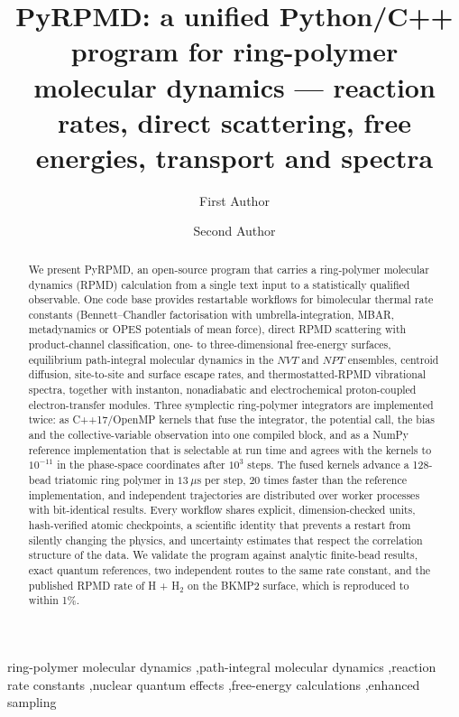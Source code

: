 \documentclass[preprint,12pt]{elsarticle}
\begin{document}
\begin{frontmatter}

\title{PyRPMD: a unified Python/C++ program for ring-polymer molecular dynamics --- reaction rates, direct scattering, free energies, transport and spectra}

\author[a]{First Author}
\author[a]{Second Author}

\address[a]{Affiliation, City, Country}

\begin{abstract}
We present PyRPMD, an open-source program that carries a ring-polymer molecular dynamics (RPMD) calculation from a single text input to a statistically qualified observable. One code base provides restartable workflows for bimolecular thermal rate constants (Bennett--Chandler factorisation with umbrella-integration, MBAR, metadynamics or OPES potentials of mean force), direct RPMD scattering with product-channel classification, one- to three-dimensional free-energy surfaces, equilibrium path-integral molecular dynamics in the $NVT$ and $NPT$ ensembles, centroid diffusion, site-to-site and surface escape rates, and thermostatted-RPMD vibrational spectra, together with instanton, nonadiabatic and electrochemical proton-coupled electron-transfer modules. Three symplectic ring-polymer integrators are implemented twice: as C++17/OpenMP kernels that fuse the integrator, the potential call, the bias and the collective-variable observation into one compiled block, and as a NumPy reference implementation that is selectable at run time and agrees with the kernels to $10^{-11}$ in the phase-space coordinates after $10^{3}$ steps. The fused kernels advance a 128-bead triatomic ring polymer in $13~\mu$s per step, 20 times faster than the reference implementation, and independent trajectories are distributed over worker processes with bit-identical results. Every workflow shares explicit, dimension-checked units, hash-verified atomic checkpoints, a scientific identity that prevents a restart from silently changing the physics, and uncertainty estimates that respect the correlation structure of the data. We validate the program against analytic finite-bead results, exact quantum references, two independent routes to the same rate constant, and the published RPMD rate of H + H$_2$ on the BKMP2 surface, which is reproduced to within 1\%.
\end{abstract}

\begin{keyword}
ring-polymer molecular dynamics \sep path-integral molecular dynamics \sep reaction rate constants \sep nuclear quantum effects \sep free-energy calculations \sep enhanced sampling
\end{keyword}

\end{frontmatter}
\end{document}
